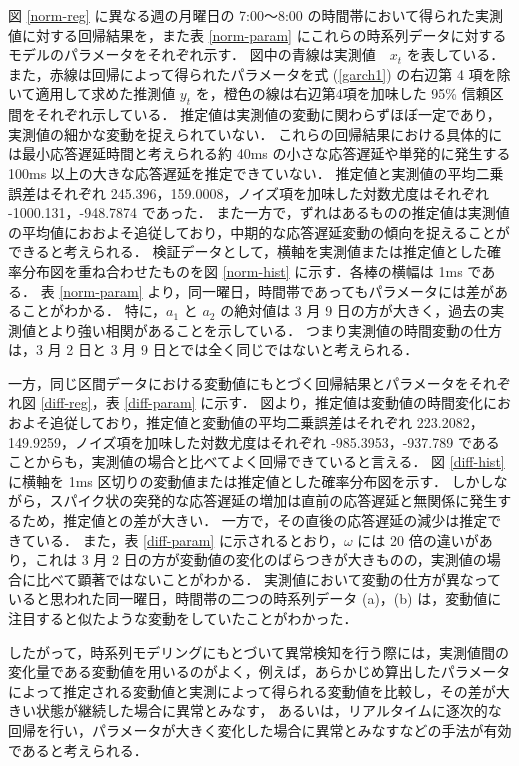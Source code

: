 \documentclass[technicalreport]{ieicej}
\begin{document}
図 \ref{norm-reg} に異なる週の月曜日の 7:00～8:00 の時間帯において得られた実測値に対する回帰結果を，また表 \ref{norm-param} にこれらの時系列データに対するモデルのパラメータをそれぞれ示す．
図中の青線は実測値　$x_t$ を表している．
また，赤線は回帰によって得られたパラメータを式 (\ref{garch1}) の右辺第 4 項を除いて適用して求めた推測値 $y_t$ を，橙色の線は右辺第4項を加味した 95\% 信頼区間をそれぞれ示している．
推定値は実測値の変動に関わらずほぼ一定であり，実測値の細かな変動を捉えられていない．
これらの回帰結果における具体的には最小応答遅延時間と考えられる約 40ms の小さな応答遅延や単発的に発生する 100ms 以上の大きな応答遅延を推定できていない．
推定値と実測値の平均二乗誤差はそれぞれ 245.396，159.0008，ノイズ項を加味した対数尤度はそれぞれ -1000.131，-948.7874 であった．
また一方で，ずれはあるものの推定値は実測値の平均値におおよそ追従しており，中期的な応答遅延変動の傾向を捉えることができると考えられる．
検証データとして，横軸を実測値または推定値とした確率分布図を重ね合わせたものを図 \ref{norm-hist} に示す．各棒の横幅は 1ms である．
表 \ref{norm-param} より，同一曜日，時間帯であってもパラメータには差があることがわかる．
特に，$a_1$ と $a_2$ の絶対値は 3 月 9 日の方が大きく，過去の実測値とより強い相関があることを示している．
つまり実測値の時間変動の仕方は，3 月 2 日と 3 月 9 日とでは全く同じではないと考えられる．

一方，同じ区間データにおける変動値にもとづく回帰結果とパラメータをそれぞれ図 \ref{diff-reg}，表 \ref{diff-param} に示す．
図より，推定値は変動値の時間変化におおよそ追従しており，推定値と変動値の平均二乗誤差はそれぞれ 223.2082，149.9259，ノイズ項を加味した対数尤度はそれぞれ -985.3953，-937.789 であることからも，実測値の場合と比べてよく回帰できていると言える．
図 \ref{diff-hist} に横軸を 1ms 区切りの変動値または推定値とした確率分布図を示す．
しかしながら，スパイク状の突発的な応答遅延の増加は直前の応答遅延と無関係に発生するため，推定値との差が大きい．
一方で，その直後の応答遅延の減少は推定できている．
また，表 \ref{diff-param} に示されるとおり，$\omega$ には 20 倍の違いがあり，これは 3 月 2 日の方が変動値の変化のばらつきが大きものの，実測値の場合に比べて顕著ではないことがわかる．
実測値において変動の仕方が異なっていると思われた同一曜日，時間帯の二つの時系列データ (a)，(b) は，変動値に注目すると似たような変動をしていたことがわかった．

したがって，時系列モデリングにもとづいて異常検知を行う際には，実測値間の変化量である変動値を用いるのがよく，例えば，あらかじめ算出したパラメータによって推定される変動値と実測によって得られる変動値を比較し，その差が大きい状態が継続した場合に異常とみなす，
あるいは，リアルタイムに逐次的な回帰を行い，パラメータが大きく変化した場合に異常とみなすなどの手法が有効であると考えられる．
\end{document}
